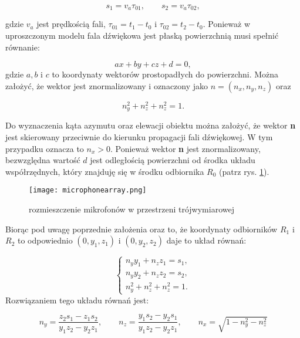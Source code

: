 \begin{equation}
	s_1 = v_a\tau_{01}, \qquad s_2 = v_a\tau_{02},
\end{equation}

gdzie $v_a$ jest prędkością fali, $\tau_{01} = t_1-t_0$ i $\tau_{02} = t_2-t_0$. 
Ponieważ w uproszczonym modelu fala dźwiękowa jest płaską powierzchnią musi spełnić równanie:

\begin{equation}
	ax + by +cz+d = 0,
\end{equation}
gdzie $a, b$ i $c$ to koordynaty wektorów prostopadłych do powierzchni. Można założyć, że wektor jest znormalizowany i oznaczony jako $n = (n_x, n_y, n_z)$ oraz

\begin{equation}
	n_y^2 + n_z^2 + n_z^2 = 1.
\end{equation}

Do wyznaczenia kąta azymutu oraz elewacji obiektu można założyć, że wektor \textbf{n} jest skierowany przeciwnie 
do kierunku propagacji fali dźwiękowej. W tym przypadku oznacza to $n_x > 0$. Ponieważ wektor \textbf{n} jest znormalizowany, 
bezwzględna wartość $d$ jest odległością powierzchni od środka układu współrzędnych, 
który znajduję się w środku odbiornika $R_0$ (patrz rys. \ref{fig:micarray}).

\begin{figure}[ht!]
	\centering
	\texttt{[image: microphonearray.png]}
	\caption{rozmieszczenie mikrofonów w przestrzeni trójwymiarowej}
	\label{fig:micarray}
\end{figure}


Biorąc pod uwagę poprzednie założenia oraz to, że koordynaty odbiorników $R_1$ i $R_2$ 
to odpowiednio $(0, y_1, z_1)$ i $(0, y_2, z_2)$ daje to układ równań:


\begin{equation}
	\begin{cases}
		n_y y_1 + n_z z_1 = s_1,\\
		n_y y_2 + n_z z_2 = s_2,\\
		n_y^2 + n_z^2 + n_z^2 = 1.	
	\end{cases}
\end{equation}
Rozwiązaniem tego układu równań jest:

\begin{equation}
	n_y= \frac{z_2s_1 - z_1s_2}{y_1z_2-y_2z_1},\qquad   n_z= \frac{y_1 s_2 - y_2 s_1}{y_1z_2-y_2 z_1}, \qquad  n_x= \sqrt{1-n_y^2-n_z^2}  
\end{equation}

